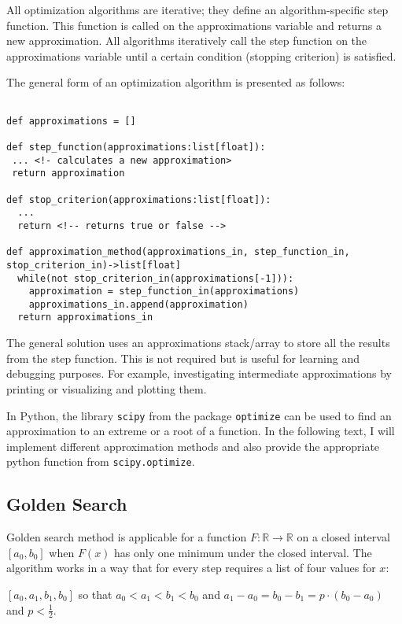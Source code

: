\documentclass[11pt]{article}
\begin{document}
All optimization algorithms are iterative; they define an
algorithm-specific step function. This function is called on the
approximations variable and returns a new approximation. All algorithms
iteratively call the step function on the approximations variable until
a certain condition (stopping criterion) is satisfied.

The general form of an optimization algorithm is presented as follows:

\begin{verbatim}

def approximations = []

def step_function(approximations:list[float]):
 ... <!- calculates a new approximation>
 return approximation

def stop_criterion(approximations:list[float]):
  ...
  return <!-- returns true or false -->

def approximation_method(approximations_in, step_function_in, stop_criterion_in)->list[float]
  while(not stop_criterion_in(approximations[-1])):
    approximation = step_function_in(approximations)
    approximations_in.append(approximation)
  return approximations_in    
\end{verbatim}

The general solution uses an approximations stack/array to store all the
results from the step function. This is not required but is useful for
learning and debugging purposes. For example, investigating intermediate
approximations by printing or visualizing and plotting them.

In Python, the library \texttt{scipy} from the package \texttt{optimize}
can be used to find an approximation to an extreme or a root of a
function. In the following text, I will implement different
approximation methods and also provide the appropriate python function
from \texttt{scipy.optimize}.

    \newpage

\subsection{Golden Search}\label{golden-search}

Golden search method is applicable for a function
\(F: \mathbb{R} \to \mathbb{R}\) on a closed interval \([a_0, b_0]\)
when \(F(x)\) has only one minimum under the closed interval. The
algorithm works in a way that for every step requires a list of four
values for \(x\):

\([a_0, a_1, b_1, b_0]\) so that \(a_0 < a_1 < b_1 < b_0\) and
\(a_1 - a_0 = b_0 - b_1 = p \cdot (b_0 - a_0)\) and \(p < \frac{1}{2}\).
\end{document}
